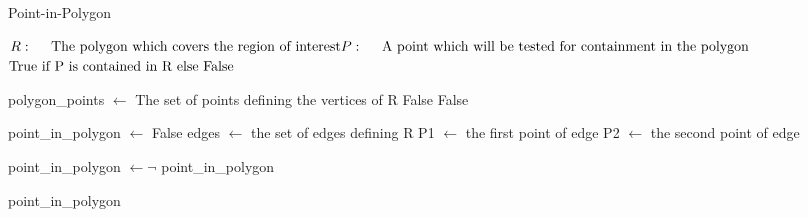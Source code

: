 \begin{algorithm}[H]{}
\caption{Point-in-Polygon}
\label{alg:PointInPolygon}
\begin{algorithmic}[1]
\renewcommand{\algorithmicrequire}{\textbf{Input:}}
\renewcommand{\algorithmicensure}{\textbf{Output:}}
\REQUIRE $ \newline R: \quad \text{ The polygon which covers the region of interest}
\newline P: \quad \text{ A point which will be tested for containment in the polygon }
$
\ENSURE $\newline \text{True if P is contained in R else False }$

\hfill\pagebreak
\STATE polygon\_points $\leftarrow$ The set of points defining the vertices of R
\RETURN False
\RETURN False



\ELSE
\STATE point\_in\_polygon $\leftarrow$ False
\STATE edges $\leftarrow$ the set of edges defining R
\STATE P1 $\leftarrow$ the first point of edge
\STATE P2 $\leftarrow$ the second point of edge

\STATE point\_in\_polygon $\leftarrow \neg$ point\_in\_polygon
\ENDIF

\ENDFOR
\ENDIF
\RETURN point\_in\_polygon
\end{algorithmic} 
\end{algorithm}


